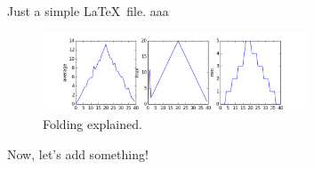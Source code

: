 \documentclass[preprint,showpacs,nofootinbib,floatfix]{revtex4-1}
\begin{document}
Just a simple \LaTeX\ file. aaa



\begin{figure}[h!]
\includegraphics[width=0.70\textwidth]{plot.png}
\caption{Folding explained.}
\label{fig_folding} 
\end{figure} 


Now, let's add something!

%


%


\vfill\eject
\newpage

\end{document}
